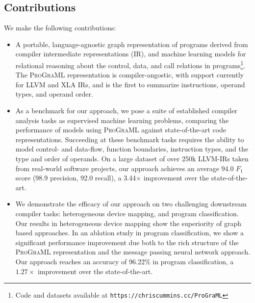 \newpage
\subsection{Contributions}

We make the following contributions:

\begin{itemize}
\item A portable, language-agnostic graph representation of programs
  derived from compiler intermediate representations (IR), and machine
  learning models for relational reasoning about the control, data,
  and call relations in programs\footnote{Code and datasets available
    at \texttt{https://chriscummins.cc/ProGraML}}. The
  \textsc{ProGraML} representation is compiler-angostic, with support
  currently for LLVM and XLA IRs, and is the first to summarize
  instructions, operand types, and operand order.
\item As a benchmark for our approach, we pose a suite of established
  compiler analysis tasks as supervised machine learning problems,
  comparing the performance of models using \textsc{ProGraML} against
  state-of-the-art code representations. Succeeding at these benchmark
  tasks requires the ability to model control- and data-flow, function
  boundaries, instruction types, and the type and order of
  operands. On a large dataset of over 250k LLVM-IRs taken from
  real-world software projects, our approach achieves an average 94.0
  $F_1$ score (98.9 precision, 92.0 recall), a 3.44$\times$
  improvement over the state-of-the-art.
\item We demonstrate the efficacy of our approach on two challenging
  downstream compiler tasks: heterogeneous device mapping, and program
  classification. Our results in heterogeneous device mapping show the
  superiority of graph based approaches. In an ablation study in
  program classification, we show a significant performance
  improvement due both to the rich structure of the \textsc{ProGraML}
  representation and the message passing neural network approach. Our
  approach reaches an accuracy of 96.22\% in program classification, a
  $1.27\times$ improvement over the state-of-the-art.
\end{itemize}
